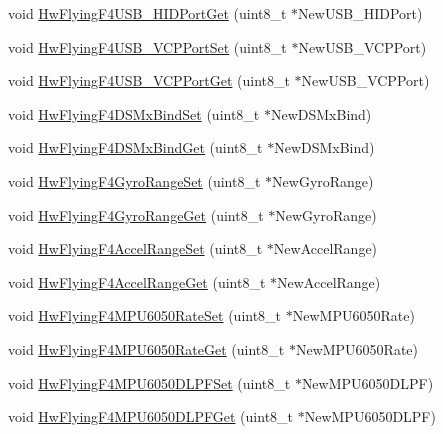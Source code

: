 \begin{DoxyCompactItemize}
\item 
void \hyperlink{group___hw_flying_f4_ga36aca640154a203e49e805ecae09bdd2}{\-Hw\-Flying\-F4\-U\-S\-B\-\_\-\-H\-I\-D\-Port\-Get} (uint8\-\_\-t $\ast$\-New\-U\-S\-B\-\_\-\-H\-I\-D\-Port)
\item 
void \hyperlink{group___hw_flying_f4_ga4615660cd8768a1553c4c6aba6b219b1}{\-Hw\-Flying\-F4\-U\-S\-B\-\_\-\-V\-C\-P\-Port\-Set} (uint8\-\_\-t $\ast$\-New\-U\-S\-B\-\_\-\-V\-C\-P\-Port)
\item 
void \hyperlink{group___hw_flying_f4_gafc67701f3be25f900a8008f149958d6c}{\-Hw\-Flying\-F4\-U\-S\-B\-\_\-\-V\-C\-P\-Port\-Get} (uint8\-\_\-t $\ast$\-New\-U\-S\-B\-\_\-\-V\-C\-P\-Port)
\item 
void \hyperlink{group___hw_flying_f4_gab7f71d1c113788365bf28e56304826b1}{\-Hw\-Flying\-F4\-D\-S\-Mx\-Bind\-Set} (uint8\-\_\-t $\ast$\-New\-D\-S\-Mx\-Bind)
\item 
void \hyperlink{group___hw_flying_f4_ga0fa1f302e425f421b6ce16e4dfd53213}{\-Hw\-Flying\-F4\-D\-S\-Mx\-Bind\-Get} (uint8\-\_\-t $\ast$\-New\-D\-S\-Mx\-Bind)
\item 
void \hyperlink{group___hw_flying_f4_ga6d7505216a258c90fe30506d8542ee91}{\-Hw\-Flying\-F4\-Gyro\-Range\-Set} (uint8\-\_\-t $\ast$\-New\-Gyro\-Range)
\item 
void \hyperlink{group___hw_flying_f4_ga4a317b888021e1ff1f623ab428c02f8e}{\-Hw\-Flying\-F4\-Gyro\-Range\-Get} (uint8\-\_\-t $\ast$\-New\-Gyro\-Range)
\item 
void \hyperlink{group___hw_flying_f4_ga561b08cb87e60bbac0120c39ed9c85c6}{\-Hw\-Flying\-F4\-Accel\-Range\-Set} (uint8\-\_\-t $\ast$\-New\-Accel\-Range)
\item 
void \hyperlink{group___hw_flying_f4_ga33361159b710defc44ef202af9b15896}{\-Hw\-Flying\-F4\-Accel\-Range\-Get} (uint8\-\_\-t $\ast$\-New\-Accel\-Range)
\item 
void \hyperlink{group___hw_flying_f4_ga84233d84d360a864d0ee855a69575fae}{\-Hw\-Flying\-F4\-M\-P\-U6050\-Rate\-Set} (uint8\-\_\-t $\ast$\-New\-M\-P\-U6050\-Rate)
\item 
void \hyperlink{group___hw_flying_f4_gac8b1103d87170a1c89e66f6d411aaaab}{\-Hw\-Flying\-F4\-M\-P\-U6050\-Rate\-Get} (uint8\-\_\-t $\ast$\-New\-M\-P\-U6050\-Rate)
\item 
void \hyperlink{group___hw_flying_f4_ga135c9de4eb6ac1bc4e3cfb45e4fa31fd}{\-Hw\-Flying\-F4\-M\-P\-U6050\-D\-L\-P\-F\-Set} (uint8\-\_\-t $\ast$\-New\-M\-P\-U6050\-D\-L\-P\-F)
\item 
void \hyperlink{group___hw_flying_f4_ga8bf34421b3aaa07097ecce27e4db7b74}{\-Hw\-Flying\-F4\-M\-P\-U6050\-D\-L\-P\-F\-Get} (uint8\-\_\-t $\ast$\-New\-M\-P\-U6050\-D\-L\-P\-F)
\end{DoxyCompactItemize}


